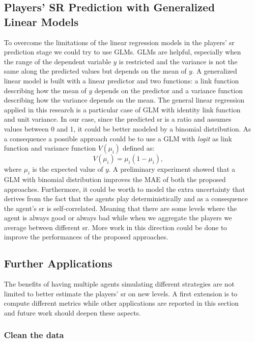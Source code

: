 \subsection{Players' SR Prediction with Generalized Linear Models}
To overcome the limitations of the linear regression models in the players' \acs{sr} prediction stage we could try to use \acfp{GLM}. \acsp{GLM} are helpful, especially when the range of the dependent variable $y$ is restricted and the variance is not the same along the predicted values but depends on the mean of $y$. A generalized linear model is built with a linear predictor and two functions: a link function describing how the mean of $y$ depends on the predictor and a variance function describing how the variance depends on the mean. The general linear regression applied in this research is a particular case of \acs{GLM} with identity link function and unit variance. In our case, since the predicted \acs{sr} is a ratio and assumes values between 0 and 1, it could be better modeled by a binomial distribution. As a consequence a possible approach could be to use a \acs{GLM} with \textit{logit} as link function and variance function $V(\mu_i)$ defined as:
\begin{equation}
    V(\mu_i) = \mu_i(1 - \mu_i) \text{,}
\end{equation}
where $\mu_i$ is the expected value of $y$.
A preliminary experiment showed that a \acs{GLM} with binomial distribution improves the \acs{MAE} of both the proposed approaches.
Furthermore, it could be worth to model the extra uncertainty that derives from the fact that the agents play deterministically and as a consequence the agent's \acs{sr} is self-correlated. Meaning that there are some levels where the agent is always good or always bad while when we aggregate the players we average between different \acs{sr}. More work in this direction could be done to improve the performances of the proposed approaches.


\subsection{Further Applications}
The benefits of having multiple agents simulating different strategies are not limited to better estimate the players' \acs{sr} on new levels. A first extension is to compute different metrics while other applications are reported in this section and future work should deepen these aspects.

\subsubsection*{Clean the data}
 

